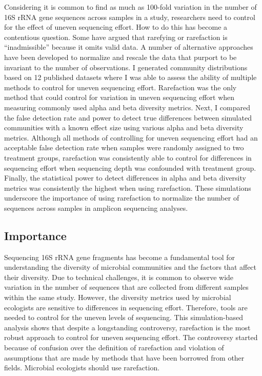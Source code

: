 \documentclass[
]{article}
\begin{document}
Considering it is common to find as much as 100-fold variation in the
number of 16S rRNA gene sequences across samples in a study, researchers
need to control for the effect of uneven sequencing effort. How to do
this has become a contentious question. Some have argued that rarefying
or rarefaction is ``inadmissible'' because it omits valid data. A number
of alternative approaches have been developed to normalize and rescale
the data that purport to be invariant to the number of observations. I
generated community distributions based on 12 published datasets where I
was able to assess the ability of multiple methods to control for uneven
sequencing effort. Rarefaction was the only method that could control
for variation in uneven sequencing effort when measuring commonly used
alpha and beta diversity metrics. Next, I compared the false detection
rate and power to detect true differences between simulated communities
with a known effect size using various alpha and beta diversity metrics.
Although all methods of controlling for uneven sequencing effort had an
acceptable false detection rate when samples were randomly assigned to
two treatment groups, rarefaction was consistently able to control for
differences in sequencing effort when sequencing depth was confounded
with treatment group. Finally, the statistical power to detect
differences in alpha and beta diversity metrics was consistently the
highest when using rarefaction. These simulations underscore the
importance of using rarefaction to normalize the number of sequences
across samples in amplicon sequencing analyses.

\hypertarget{importance}{%
\subsection{Importance}\label{importance}}

Sequencing 16S rRNA gene fragments has become a fundamental tool for
understanding the diversity of microbial communities and the factors
that affect their diversity. Due to technical challenges, it is common
to observe wide variation in the number of sequences that are collected
from different samples within the same study. However, the diversity
metrics used by microbial ecologists are sensitive to differences in
sequencing effort. Therefore, tools are needed to control for the uneven
levels of sequencing. This simulation-based analysis shows that despite
a longstanding controversy, rarefaction is the most robust approach to
control for uneven sequencing effort. The controversy started because of
confusion over the definition of rarefaction and violation of
assumptions that are made by methods that have been borrowed from other
fields. Microbial ecologists should use rarefaction.
\end{document}
